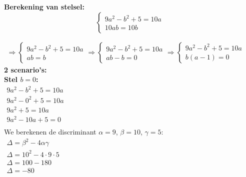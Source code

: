 \documentclass[a4paper]{article}
\begin{document}
\textbf{Berekening van stelsel: }   \\

$$\left\{
    \begin{array}{l}
        9a^2 - b^2 + 5 = 10a        \\
        10ab = 10b
    \end{array}
\right .$$

$\begin{array}{l}
    \Rightarrow
    \left\{
        \begin{array}{l}
            9a^2 - b^2 + 5 = 10a    \\
            ab = b
        \end{array}
    \right .
    \Rightarrow
    \left\{
        \begin{array}{l}
            9a^2 - b^2 + 5 = 10a    \\
            ab - b = 0
        \end{array}
    \right .
    \Rightarrow
    \left\{
        \begin{array}{l}
            9a^2 - b^2 + 5 = 10a    \\
            b(a-1) = 0
        \end{array}
    \right .
\end{array}$            \\

\textbf{2 scenario's:}  \\

\textbf{Stel $b = 0$:}  \\

$\begin{array}{l}
    9a^2 - b^2 + 5 = 10a    \\
    9a^2 - 0^2 + 5 = 10a    \\
    9a^2 + 5       = 10a    \\
    9a^2 - 10a + 5 = 0      \\
\end{array}$                \\

We berekenen de discriminant $\alpha = 9$, $\beta = 10$, $\gamma = 5$:      \\

$\begin{array}{l}
    \Delta = \beta^2 - 4 \alpha \gamma  \\
    \Delta = 10^2 - 4 \cdot 9 \cdot 5   \\
    \Delta = 100 - 180                  \\
    \Delta = -80                        \\
\end{array}$  \\
\end{document}
